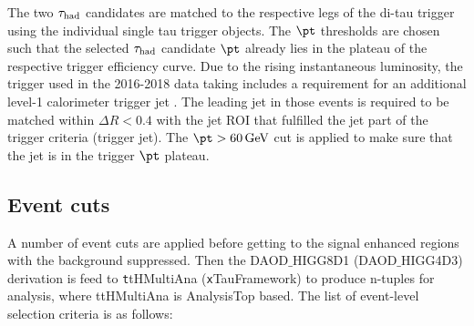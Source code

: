 The two $\tau_\text{had}$ candidates are matched to the respective legs of the di-tau trigger using the individual single tau trigger objects. The $\pt$ thresholds are chosen such that the selected $\tau_\text{had}$ candidate $\pt$ already lies in the plateau of the respective trigger efficiency curve. Due to the rising instantaneous luminosity, the trigger used in the 2016-2018 data taking includes a requirement for an additional level-1 calorimeter trigger jet 
. The leading jet in those events is required to be matched within $\Delta R < 0.4$ with the jet ROI that fulfilled the jet part of the trigger criteria (trigger jet). The $\pt > \SI{60}{\GeV}$ cut is applied to make sure that the jet is in the trigger $\pt$ plateau.

\subsection{Event cuts}
\label{sec:cuts}

A number of event cuts are applied before getting to the signal enhanced regions with the background suppressed. Then the DAOD$\_$HIGG8D1 (DAOD$\_$HIGG4D3) derivation is feed to {\texttt ttHMultiAna} ({\texttt xTauFramework}) to produce n-tuples for analysis, where ttHMultiAna is AnalysisTop \cite{AnalysisTop} based. The list of event-level selection criteria is as follows:

